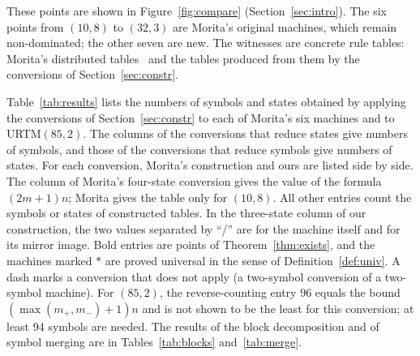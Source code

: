 \documentclass{article}
\theoremstyle{definition}
\theoremstyle{remark}
\begin{document}
These points are shown in Figure~\ref{fig:compare} (Section~\ref{sec:intro}).
The six points from $(10,8)$ to $(32,3)$ are Morita's original machines, which remain non-dominated; the other seven are new.
The witnesses are concrete rule tables: Morita's distributed tables~\cite{MoritaFiles} and the tables produced from them by the conversions of Section~\ref{sec:constr}.

Table~\ref{tab:results} lists the numbers of symbols and states obtained by applying the conversions of Section~\ref{sec:constr} to each of Morita's six machines and to URTM$(85,2)$. The columns of the conversions that reduce states give numbers of symbols, and those of the conversions that reduce symbols give numbers of states. For each conversion, Morita's construction and ours are listed side by side. The column of Morita's four-state conversion gives the value of the formula $(2m+1)n$; Morita gives the table only for $(10,8)$. All other entries count the symbols or states of constructed tables. In the three-state column of our construction, the two values separated by ``/'' are for the machine itself and for its mirror image. Bold entries are points of Theorem~\ref{thm:exists}, and the machines marked $\ast$ are proved universal in the sense of Definition~\ref{def:univ}. A dash marks a conversion that does not apply (a two-symbol conversion of a two-symbol machine). For $(85,2)$, the reverse-counting entry 96 equals the bound $(\max(m_+,m_-)+1)n$ and is not shown to be the least for this conversion; at least 94 symbols are needed. The results of the block decomposition and of symbol merging are in Tables~\ref{tab:blocks} and~\ref{tab:merge}.

\begin{table}[tb]
\centering
\caption{Computed results of the conversions applied to each URTM}
\label{tab:results}
\small
{}
\end{table}
\end{document}
